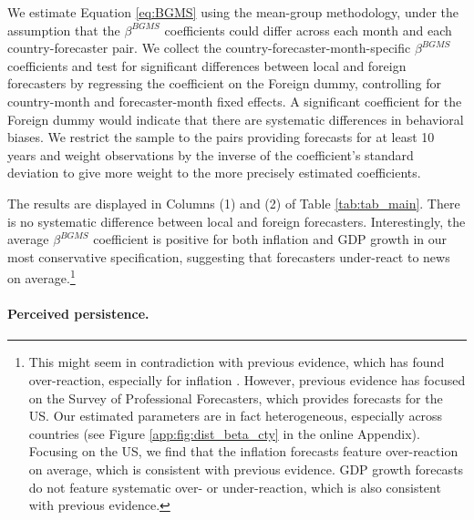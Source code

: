 We estimate Equation \eqref{eq:BGMS} using the mean-group methodology, under the assumption that the $\beta^{BGMS}$ coefficients could differ across each month and each country-forecaster pair. We collect the country-forecaster-month-specific $\beta^{BGMS}$ coefficients and test for significant differences between local and foreign forecasters by regressing the coefficient on the Foreign dummy, controlling for country-month and forecaster-month fixed effects. A significant coefficient for the Foreign dummy would indicate that there are systematic differences in behavioral biases. We restrict the sample to the pairs providing forecasts for at least 10 years and weight observations by the inverse of the coefficient's standard deviation to give more weight to the more precisely estimated coefficients.


The results are displayed in Columns (1) and (2) of Table \ref{tab:tab_main}. There is no systematic difference between local and foreign forecasters. Interestingly, the average $\beta^{BGMS}$ coefficient is positive for both inflation and GDP growth in our most conservative specification, suggesting that forecasters under-react to news on average.\footnote{This might seem in contradiction with previous evidence, which has found over-reaction, especially for inflation \citep{Bordaloetal2020,BroerKohlhas2019,Angeletosetal2020}. However, previous evidence has focused on the Survey of Professional Forecasters, which provides forecasts for the US. Our estimated parameters are in fact heterogeneous, especially across countries (see Figure \ref{app:fig:dist_beta_cty} in the online Appendix). Focusing on the US, we find that the inflation forecasts feature over-reaction on average, which is consistent with previous evidence. GDP growth forecasts do not feature systematic over- or under-reaction, which is also consistent with previous evidence.}

\begin{landscape}
	\enlargethispage{2em}
	{
		
	}
\end{landscape}



\paragraph{Perceived persistence.}

